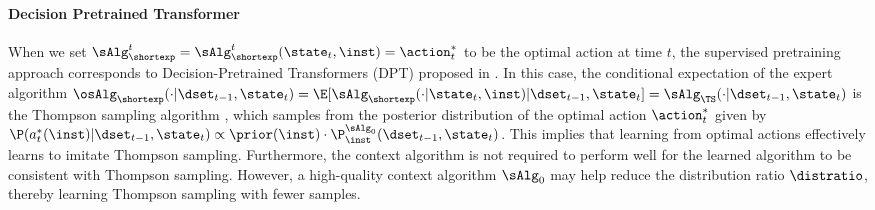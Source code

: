 \documentclass[10pt]{article}
\begin{document}

\paragraph{Decision Pretrained Transformer} When we set $\sAlg_\shortexp^t = \sAlg_\shortexp^t(\state_t,\inst)=\action^*_t$ to be the optimal action at time $t$, the supervised pretraining approach corresponds to Decision-Pretrained Transformers (DPT) proposed in \cite{lee2023supervised}. In this case, the conditional expectation of the expert algorithm $\osAlg_\shortexp(\cdot|\dset_{t-1},\state_t)=\E[\sAlg_{\shortexp}(\cdot|\state_t,\inst)|\dset_{t-1},\state_t]=\sAlg_{\TS}(\cdot|\dset_{t-1},\state_t)$ is the Thompson sampling algorithm \citep[Theorem 1]{lee2023supervised}, which samples from the posterior distribution of the optimal action $\action^*_t$ given by $\P(a^*_t(\inst) |\dset_{t-1},\state_t)\propto \prior(\inst)\cdot\P_\inst^{\sAlg_0}(\dset_{t-1},\state_t)$. This implies that learning from optimal actions effectively learns to imitate Thompson sampling. Furthermore, the context algorithm is not required to perform well for the learned algorithm to be consistent with Thompson sampling. However, a high-quality context algorithm $\sAlg_0$ may help reduce the distribution ratio $\distratio$, thereby learning Thompson sampling with fewer samples. 


\end{document}
